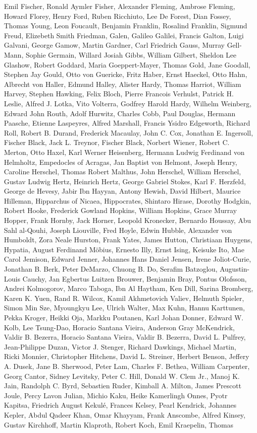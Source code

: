 \begin{spacing}{0.5}
\begin{tiny}
Emil Fischer, Ronald Aymler Fisher, Alexander Fleming, Ambrose Fleming, Howard Florey, Henry Ford, Ruben Ricchiuto, Lee De Forest, Dian Fossey, Thomas Young, Leon Foucault, Benjamin Franklin, Rosalind Franklin, Sigmund Freud, Elizebeth Smith Friedman, Galen, Galileo Galilei, Francis Galton, Luigi Galvani, George Gamow, Martin Gardner, Carl Friedrich Gauss, Murray Gell-Mann, Sophie Germain, Willard Josiah Gibbs, William Gilbert, Sheldon Lee Glashow, Robert Goddard, Maria Goeppert-Mayer, Thomas Gold, Jane Goodall, Stephen Jay Gould, Otto von Guericke, Fritz Haber, Ernst Haeckel, Otto Hahn, Albrecht von Haller, Edmund Halley, Alister Hardy, Thomas Harriot, William Harvey, Stephen Hawking, Felix Bloch, Pierre Francois Verhulst, Patrick H. Leslie, Alfred J. Lotka, Vito Volterra, Godfrey Harold Hardy, Wilhelm Weinberg, Edward John Routh, Adolf Hurwitz, Charles Cobb, Paul Douglas, Hermann Paasche, Etienne Laspeyres, Alfred Marshall, Francis Ysidro Edgeworth, Richard Roll, Robert B. Durand, Frederick Macaulay, John C. Cox, Jonathan E. Ingersoll, Fischer Black, Jack L. Treynor, Fischer Black, Norbert Wiener, Robert C. Merton, Otto Haxel, Karl Werner Heisenberg, Hermann Ludwig Ferdinand von Helmholtz, Empedocles of Acragas, Jan Baptist von Helmont, Joseph Henry, Caroline Herschel, Thomas Robert Malthus, John Herschel, William Herschel, Gustav Ludwig Hertz, Heinrich Hertz, George Gabriel Stokes, Karl F. Herzfeld, George de Hevesy, Jabir Ibn Hayyan, Antony Hewish, David Hilbert, Maurice Hilleman, Hipparchus of Nicaea, Hippocrates, Shintaro Hirase, Dorothy Hodgkin, Robert Hooke, Frederick Gowland Hopkins, William Hopkins, Grace Murray Hopper, Frank Hornby, Jack Horner, Leopold Kronecker, Bernardo Houssay, Abu Sahl al-Qouhi, Joseph Liouville, Fred Hoyle, Edwin Hubble, Alexander von Humboldt, Zora Neale Hurston, Frank Yates,  James Hutton, Christiaan Huygens, Hypatia, August Ferdinand Möbius, Ernesto Illy, Ernst Ising, Keisuke Ito, Mae Carol Jemison, Edward Jenner, Johannes Hans Daniel Jensen, Irene Joliot-Curie, Jonathan B. Berk, Peter DeMarzo, Chuong B. Do, Serafim Batzoglou, Augustin-Louis Cauchy, Jan Egbertus Luitzen Brouwer, Benjamin Bray, Pontus Olofsson, Andrei Kolmogorov, Marco Taboga, Ibn Al Haytham, Ken Dill, Sarina Bromberg, Karen K. Yuen, Rand R. Wilcox, Kamil Akhmetovich Valiev, Helmuth Spieler, Simon Min Sze, Myoungkyu Lee, Ulrich Walter, Max Kuhn, Hannu Karttunen, Pekka Kroger, Heikki Oja, Markku Poutanen, Karl Johan Donner, Edward W. Kolb, Lee Tsung-Dao, Horacio Santana Vieira, Anderson Gray McKendrick,  Valdir B. Bezerra, Horacio Santana Vieira, Valdir B. Bezerra, David L. Pulfrey, Jean-Philippe Duzan, Victor J. Stenger, Richard Dawkings, Michael Martin, Ricki Monnier, Christopher Hitchens, David L. Streiner, Herbert Benson, Jeffery A. Dusek, Jane B. Sherwood, Peter Lam, Charles F. Bethea, William Carpenter, Georg Cantor, Sidney Levitsky, Peter C. Hill, Donald W. Clem  Jr., Manoj K. Jain, Randolph C. Byrd, Sebastien Ruder, Kimball A. Milton, James Prescott Joule, Percy Lavon Julian, Michio Kaku, Heike Kamerlingh Onnes, Pyotr Kapitsa, Friedrich August Kekulé, Frances Kelsey, Pearl Kendrick, Johannes Kepler, Abdul Qadeer Khan, Omar Khayyam, Frank Anscombe, Alfred Kinsey, Gustav Kirchhoff, Martin Klaproth, Robert Koch, Emil Kraepelin, Thomas 
\end{tiny}
\end{spacing}
